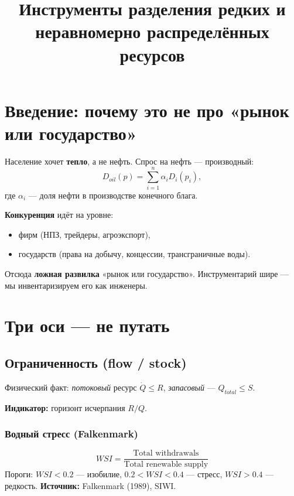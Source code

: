 \documentclass[12pt]{article}
\title{\textbf{Инструменты разделения редких и неравномерно распределённых ресурсов}}
\author{}
\date{}
\begin{document}
\maketitle
\thispagestyle{fancy}

\section{Введение: почему это не про «рынок или государство»}

Население хочет \textbf{тепло}, а не нефть. Спрос на нефть --- производный:
\begin{equation}\label{eq:derived}
D_{oil}(p) = \sum_{i=1}^{n} \alpha_i D_i(p_i),
\end{equation}
где $\alpha_i$ --- доля нефти в производстве конечного блага.

\textbf{Конкуренция} идёт на уровне:
\begin{itemize}
\item фирм (НПЗ, трейдеры, агроэкспорт),
\item государств (права на добычу, концессии, трансграничные воды).
\end{itemize}

Отсюда \textbf{ложная развилка} «рынок или государство». Инструментарий шире --- мы инвентаризируем его как инженеры.

\section{Три оси --- не путать}

\subsection{Ограниченность (flow / stock)}
Физический факт: \emph{потоковый} ресурс $\dot{Q} \le R$, \emph{запасовый} --- $Q_{total} \le S$.

\textbf{Индикатор:} горизонт исчерпания $R/Q$.

\subsubsection{Водный стресс (Falkenmark)}
$$
WSI = \frac{\text{Total withdrawals}}{\text{Total renewable supply}}
$$
Пороги: $WSI<0.2$ — изобилие, $0.2<WSI<0.4$ — стресс, $WSI>0.4$ — редкость.
\textbf{Источник:} Falkenmark (1989), SIWI.
\end{document}
